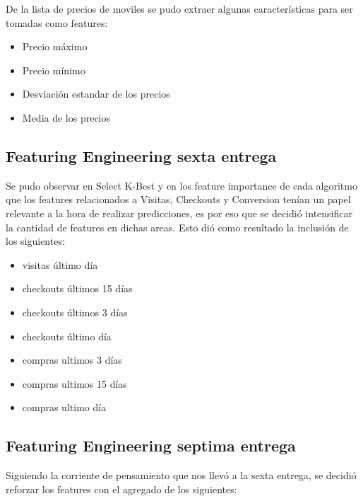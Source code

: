 \documentclass[a4paper ,12pt]{article}
\begin{document}
De la lista de precios de moviles se pudo extraer algunas características para ser tomadas como features:

\begin{itemize}
	\item Precio máximo
	\item Precio mínimo
	\item Desviación estandar de los precios
	\item Media de los precios
\end{itemize}

\subsection{Featuring Engineering sexta entrega}

Se pudo observar en Select K-Best y en los feature importance de cada algoritmo que los features relacionados a Visitas, Checkouts y Conversion tenían un papel relevante a la hora de realizar predicciones, es por eso que se decidió intensificar la cantidad de features en dichas areas. Esto dió como resultado la inclusión de los siguientes:

\begin{itemize}
	
	\item visitas último día
	
	\item checkouts últimos 15 días
	
	\item checkouts últimos 3 días
	
	\item checkouts último día
	
	\item compras ultimos 3 días
	
	\item compras ultimos 15 días
	
	\item compras ultimo día
	
\end{itemize}



\subsection{Featuring Engineering septima entrega}

		Siguiendo la corriente de pensamiento que nos llevó a la sexta entrega, se decidió reforzar los features con el agregado de los siguientes:	
		
\end{document}
